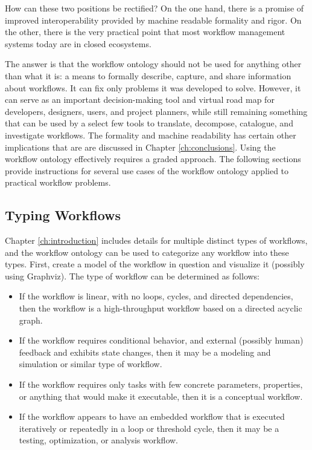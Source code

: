 How can these two positions be rectified? On the one hand, there is a promise of
improved interoperability provided by machine readable formality and rigor. On
the other, there is the very practical point that most workflow management
systems today are in closed ecosystems.

The answer is that the workflow ontology should not be used for anything other
than what it is: a means to formally describe, capture, and share information
about workflows. It can fix only problems it was developed to solve. However, it
can serve as an important decision-making tool and virtual road map for
developers, designers, users, and project planners, while still remaining
something that can be used by a select few tools to translate, decompose,
catalogue, and investigate workflows. The formality and machine readability
has certain other implications that are are discussed in Chapter
\ref{ch:conclusions}. Using the workflow ontology effectively requires a graded
approach. The following sections provide instructions for several use cases of
the workflow ontology applied to practical workflow problems.

\subsection{Typing Workflows}

Chapter \ref{ch:introduction} includes details for multiple distinct types of
workflows, and the workflow ontology can be used to categorize any workflow into
these types. First, create a model of the workflow in question and visualize it
(possibly using Graphviz). The type of workflow can be determined as follows:
\begin{itemize}
  \item If the workflow is linear, with no loops, cycles, and directed
  dependencies, then the workflow is a high-throughput workflow based on a
  directed acyclic graph.
  \item If the workflow requires conditional behavior, and external (possibly
  human) feedback and exhibits state changes, then it may be a
  modeling and simulation or similar type of workflow.
  \item If the workflow requires only tasks with few concrete parameters,
  properties, or anything that would make it executable, then it is a conceptual
  workflow.
  \item If the workflow appears to have an embedded workflow that is executed
  iteratively or repeatedly in a loop or threshold cycle, then it may be a
  testing, optimization, or analysis workflow.
\end{itemize}

